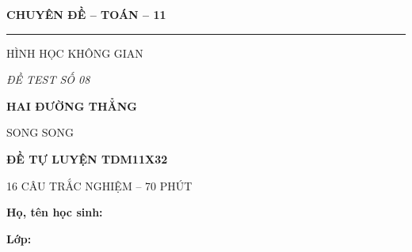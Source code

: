 \documentclass[12pt,a4paper]{article}
\begin{document}
\noindent
\begin{minipage}[t]{.35\textwidth}
  \centering
  {\bfseries CHUYÊN ĐỀ -- TOÁN -- 11\par}
  \vspace{2pt}\rule{.72\linewidth}{.4pt}\par\vspace{3pt}
  HÌNH HỌC KHÔNG GIAN\par\vspace{4pt}
  {\itshape ĐỀ TEST SỐ 08\par}
\end{minipage}\hfill
\begin{minipage}[t]{.62\textwidth}
  \centering
  {\bfseries HAI ĐƯỜNG THẲNG\par
  SONG SONG\par}
  \vspace{5pt}
  {\small\bfseries ĐỀ TỰ LUYỆN TDM11X32\par
  16 CÂU TRẮC NGHIỆM -- 70 PHÚT\par}
\end{minipage}
\vspace{5mm}
\noindent
\begin{minipage}[t]{.72\textwidth}
  \textbf{Họ, tên học sinh:}\dotfill\par
  \vspace{3pt}
  \textbf{Lớp:}\dotfill
\end{minipage}\hfill
\begin{minipage}[t]{.25\textwidth}
  \raggedleft\setlength{\fboxsep}{4pt}
\end{minipage}
\end{document}
